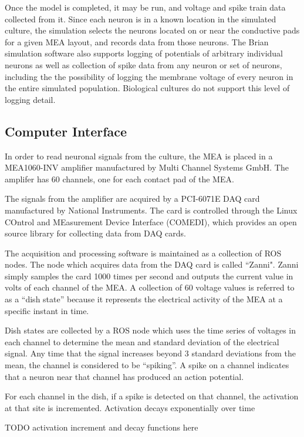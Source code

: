 \documentclass[letterpaper]{article}
\begin{document}
Once the model is completed, it may be run, and voltage and spike train data collected from it. 
Since each neuron is in a known location in the simulated culture, the simulation selects the neurons located on or near the conductive pads for a given MEA layout, and records data from those neurons. 
The Brian simulation software also supports logging of potentials of arbitrary individual neurons as well as collection of spike data from any neuron or set of neurons, including the the possibility of logging the membrane voltage of every neuron in the entire simulated population.
Biological cultures do not support this level of logging detail.  

\subsection{Computer Interface}

In order to read neuronal signals from the culture, the MEA is placed in a MEA1060-INV amplifier manufactured by Multi Channel Systems GmbH. 
The amplifer has 60 channels, one for each contact pad of the MEA.

The signals from the amplifier are acquired by a PCI-6071E DAQ card manufactured by National Instruments. 
The card is controlled through the Linux COntrol and MEasurement Device Interface (COMEDI), which provides an open source library for collecting data from DAQ cards. 

The acquisition and processing software is maintained as a collection of ROS nodes.
The node which acquires data from the DAQ card is called ``Zanni". 
Zanni simply samples the card 1000 times per second and outputs the current value in volts of each channel of the MEA. 
A collection of 60 voltage values is referred to as a ``dish state'' because it represents the electrical activity of the MEA at a specific instant in time. 

Dish states are collected by a ROS node which uses the time series of voltages in each channel to determine the mean and standard deviation of the electrical signal. 
Any time that the signal increases beyond 3 standard deviations from the mean, the channel is considered to be ``spiking''. 
A spike on a channel indicates that a neuron near that channel has produced an action potential. 

For each channel in the dish, if a spike is detected on that channel, the activation at that site is incremented. 
Activation decays exponentially over time 

TODO activation increment and decay functions here
\end{document}
